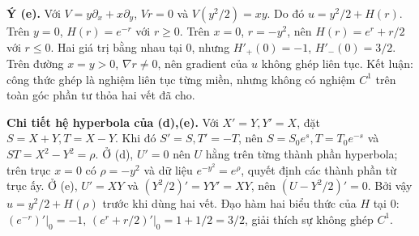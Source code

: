 \documentclass[10pt,a4paper]{article}
\begin{document}
\textbf{Ý (e).} Với $V=y\partial_x+x\partial_y$, $Vr=0$ và $V(y^2/2)=xy$. Do đó $u=y^2/2+H(r)$. Trên $y=0$, $H(r)=e^{-r}$ với $r\ge0$. Trên $x=0$, $r=-y^2$, nên $H(r)=e^r+r/2$ với $r\le0$. Hai giá trị bằng nhau tại 0, nhưng $H'_+(0)=-1$, $H'_-(0)=3/2$. Trên đường $x=y>0$, $\nabla r\ne0$, nên gradient của $u$ không ghép liên tục. Kết luận: công thức ghép là nghiệm liên tục từng miền, nhưng không có nghiệm $C^1$ trên toàn góc phần tư thỏa hai vết đã cho.

\textbf{Chi tiết hệ hyperbola của (d),(e).} Với $X'=Y,Y'=X$, đặt $S=X+Y,T=X-Y$. Khi đó $S'=S,T'=-T$, nên $S=S_0e^s,T=T_0e^{-s}$ và $ST=X^2-Y^2=\rho$. Ở (d), $U'=0$ nên $U$ hằng trên từng thành phần hyperbola; trên trục $x=0$ có $\rho=-y^2$ và dữ liệu $e^{-y^2}=e^\rho$, quyết định các thành phần từ trục ấy. Ở (e), $U'=XY$ và $(Y^2/2)'=YY'=XY$, nên $(U-Y^2/2)'=0$. Bởi vậy $u=y^2/2+H(\rho)$ trước khi dùng hai vết. Đạo hàm hai biểu thức của $H$ tại $0$: $(e^{-r})'|_0=-1$, $(e^r+r/2)'|_0=1+1/2=3/2$, giải thích sự không ghép $C^1$.
\end{document}
